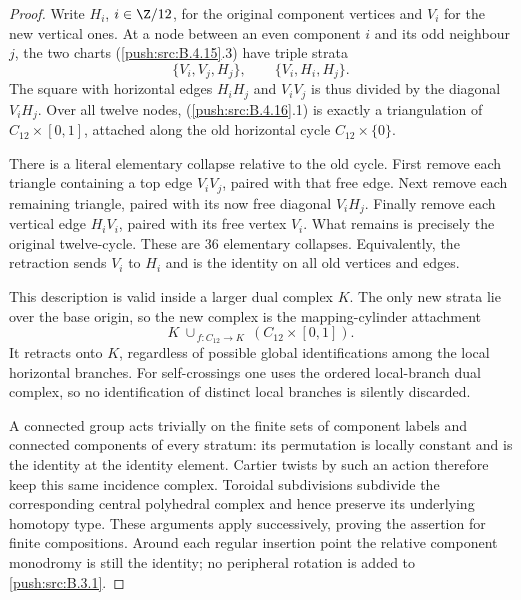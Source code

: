 \begin{proof}
Write $H_i$, $i\in\Z/12$, for the original component
vertices and $V_i$ for the new vertical ones. At a node
between an even component $i$ and its odd neighbour
$j$, the two charts (\ref{push:src:B.4.15}.3) have triple strata
\[
 \{V_i,V_j,H_j\},\qquad
 \{V_i,H_i,H_j\}.
 \tag{B.4.16.1}
\]
The square with horizontal edges $H_iH_j$ and $V_iV_j$
is thus divided by the diagonal $V_iH_j$. Over all
twelve nodes, (\ref{push:src:B.4.16}.1) is exactly a triangulation of
$C_{12}\times[0,1]$, attached along the old horizontal
cycle $C_{12}\times\{0\}$.

There is a literal elementary collapse relative to the
old cycle. First remove each triangle containing a top
edge $V_iV_j$, paired with that free edge. Next remove
each remaining triangle, paired with its now free
diagonal $V_iH_j$. Finally remove each vertical edge
$H_iV_i$, paired with its free vertex $V_i$. What remains
is precisely the original twelve-cycle. These are
$36$ elementary collapses. Equivalently, the retraction
sends $V_i$ to $H_i$ and is the identity on all old
vertices and edges.

This description is valid inside a larger dual complex
$K$. The only new strata lie over the base origin,
so the new complex is the mapping-cylinder attachment
\[
 K\ \cup_{\,f:C_{12}\to K}\
           (C_{12}\times[0,1]).
\]
It retracts onto $K$, regardless of possible global
identifications among the local horizontal branches.
For self-crossings one uses the ordered local-branch
dual complex, so no identification of distinct local
branches is silently discarded.

A connected group acts trivially on the finite sets
of component labels and connected components of every
stratum: its permutation is locally constant and is
the identity at the identity element. Cartier twists
by such an action therefore keep this same incidence
complex. Toroidal subdivisions subdivide the
corresponding central polyhedral complex and hence
preserve its underlying homotopy type. These arguments
apply successively, proving the assertion for finite
compositions. Around each regular insertion point the
relative component monodromy is still the identity;
no peripheral rotation is added to \ref{push:src:B.3.1}.


\end{proof}
